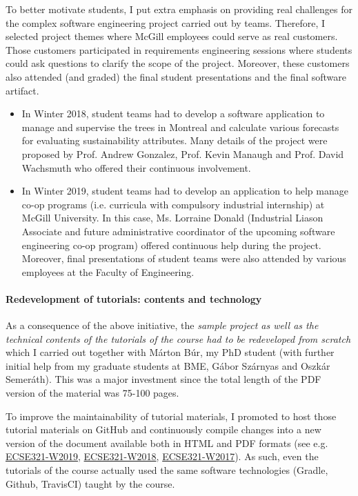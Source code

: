 \documentclass[a4paper,11pt]{report}
\begin{document}
To better motivate students, I put extra emphasis on providing real challenges for the complex software engineering project carried out by teams. Therefore, I selected project themes where McGill employees could serve as real customers. Those customers participated in requirements engineering sessions where students could ask questions to clarify the scope of the project. Moreover, these customers also attended (and graded) the final student presentations and the final software artifact.
\begin{itemize}
\item In Winter 2018, student teams had to develop a software application to manage and supervise the trees in Montreal and calculate various forecasts for evaluating sustainability attributes. Many details of the project were proposed by Prof. Andrew Gonzalez, Prof. Kevin Manaugh and Prof. David Wachsmuth who offered their continuous involvement.
\item In Winter 2019, student teams had to develop an application to help manage co-op programs (i.e. curricula with compulsory industrial internship) at McGill University. In this case, Ms. Lorraine Donald (Industrial Liason Associate and future administrative coordinator of the upcoming software engineering co-op program) offered continuous help during the project. Moreover, final presentations of student teams were also attended by various employees at the Faculty of Engineering.
\end{itemize}


\paragraph{Redevelopment of tutorials: contents and technology}
As a consequence of the above initiative, the \emph{sample project as well as the technical contents of the tutorials of the course had to be redeveloped from scratch} which I carried out together with Márton Búr, my PhD student (with further initial help from my graduate students at BME, Gábor Szárnyas and Oszkár Semeráth). This was a major investment since the total length of the PDF version of the material was 75-100 pages. 

To improve the maintainability of tutorial materials, I promoted to host those tutorial materials on GitHub and continuously compile changes into a new version of the document available both in HTML and PDF formats (see e.g. 
\href{https://mcgill-ecse321-winter2019.github.io/EventRegistration-Tutorials/}{ECSE321-W2019}, 
\href{https://mcgill-ecse321-winter2018.github.io/EventRegistration-Tutorials/}{ECSE321-W2018}, 
\href{https://ecse321-winter2017-mcgill.github.io/EventRegistration-Tutorials/}{ECSE321-W2017}). As such, even the tutorials of the course actually used the same software technologies (Gradle, Github, TravisCI) taught by the course. 
\end{document}
